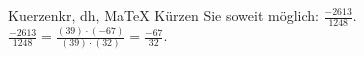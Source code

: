 \begin{MAufgabe}{Kuerzen}{kr, dh, MaTeX}
K\"urzen Sie soweit m\"oglich: $\frac{-2613}{1248}$.\\ 
\ifLsg\MLoesung
\quad $\frac{-2613}{1248}=\frac{(39)\cdot(-67)}{(39)\cdot(32)}=\frac{-67}{32}$.\else\relax\fi
 \end{MAufgabe}